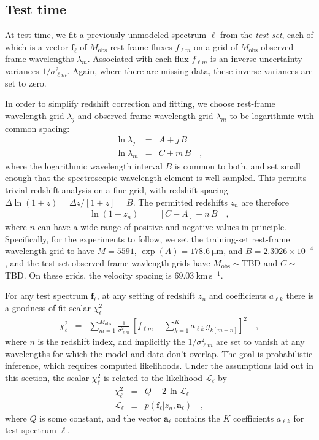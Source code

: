 \documentclass[apj]{emulateapj}
\newcommand{\unit}[1]{\mathrm{#1}}
\newcommand{\km}{\unit{km}}
\newcommand{\s}{\unit{s}}
\newcommand{\kmps}{\km\,\s^{-1}}
\newcommand{\mum}{\unit{\mu m}}
\newcommand{\mmatrix}[1]{\boldsymbol{#1}}
\newcommand{\avec}{\mmatrix{a}}
\newcommand{\fvec}{\mmatrix{f}}
\newcommand{\obs}{\mathrm{obs}}
\newcommand{\like}{\mathscr{L}}
\begin{document}
\subsection{Test time}

At test time, we fit a previously unmodeled spectrum $\ell$ from the
\emph{test set}, each of which is a vector $\fvec_\ell$ of $M_\obs$
rest-frame fluxes $f_{\ell m}$ on a grid of $M_\obs$ observed-frame
wavelengths $\lambda_m$.  Associated with each flux $f_{\ell m}$ is an
inverse uncertainty variances $1/\sigma^2_{\ell m}$.  Again, where
there are missing data, these inverse variances are set to zero.

In order to simplify redshift correction and fitting, we choose
rest-frame wavelength grid $\lambda_j$ and observed-frame wavelength
grid $\lambda_m$ to be logarithmic with common spacing:
\begin{eqnarray}\displaystyle
\ln\lambda_j &=& A + j\,B \nonumber\\
\ln\lambda_m &=& C + m\,B
\quad ,
\end{eqnarray}
where the logarithmic wavelength interval $B$ is common to both, and
set small enough that the spectroscopic wavelength element is well
sampled.  This permits trivial redshift analysis on a fine grid, with
redshift spacing $\Delta\ln(1+z)=\Delta z/[1+z]=B$.  The permitted
redshifts $z_n$ are therefore
\begin{eqnarray}\displaystyle
\ln(1+z_n) &=& [C - A] + n\,B
\quad ,
\end{eqnarray}
where $n$ can have a wide range of positive and negative values in
principle.  Specifically, for the experiments to follow, we set the
training-set rest-frame wavelength grid to have $M=5591$,
$\exp(A)=178.6~\mum$, and $B=2.3026\times10^{-4}$, and the test-set
observed-frame wavlength grids have $M_\obs\sim$TBD and $C\sim$TBD.
On these grids, the velocity spacing is $69.03~\kmps$.

For any test spectrum $\fvec_\ell$, at any setting of redshift $z_n$
and coefficients $a_{\ell k}$ there is a goodness-of-fit scalar
$\chi^2_\ell$
\begin{eqnarray}\displaystyle
\chi^2_\ell &=& \sum_{m=1}^{M_\obs} \frac{1}{\sigma^2_{\ell m}}
 \,\left[f_{\ell m} - \sum_{k=1}^K a_{\ell k}\,g_{k[m-n]}\right]^2
\quad,
\end{eqnarray}
where $n$ is the redshift index, and implicitly the $1/\sigma^2_{\ell
  m}$ are set to vanish at any wavelengths for which the model and
data don't overlap.  The goal is probabilistic inference, which
requires computed likelihoods.  Under the assumptions laid out in this
section, the scalar $\chi^2_\ell$ is related to the likelihood
$\like_\ell$ by
\begin{eqnarray}\displaystyle
\chi^2_\ell &=& Q - 2\,\ln\like_\ell \nonumber\\
\like_\ell &\equiv& p(\fvec_\ell|z_n,\avec_\ell)
\quad ,
\end{eqnarray}
where $Q$ is some constant, and the vector $\avec_\ell$ contains the
$K$ coefficients $a_{\ell k}$ for test spectrum $\ell$.
\end{document}
